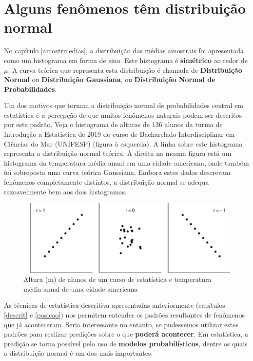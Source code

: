 \documentclass[
]{book}
\begin{document}
\hypertarget{normdist}{%
\chapter{Alguns fenômenos têm distribuição normal}\label{normdist}}

No capítulo \ref{amostrmedias}, a distribuição das médias amostrais foi apresentada como um histograma em forma de sino. Este histograma é \textbf{simétrico} ao redor de \(\mu\). A curva teórica que representa esta distribuição é chamada de \textbf{Distribuição Normal} ou \textbf{Distribuição Gaussiana}, ou \textbf{Distribuição Normal de Probabilidades}.

Um dos motivos que tornam a distribuição normal de probabilidades central em estatística é a percepção de que muitos fenômenos naturais podem ser descritos por este padrão. Veja o histograma de alturas de 136 alunos da turma de Introdução a Estatística de 2019 do curso de Bacharelado Interdisciplinar em Ciências do Mar (UNIFESP) (figura à esquerda). A linha sobre este histograma representa a distribuição normal teórica. À direita na mesma figura está um histograma da temperatura média anual em uma cidade americana, onde também foi sobreposta uma curva teórica Gaussiana. Embora estes dados descrevam fenômenos completamente distintos, a distribuição normal se adequa razoavelmente bem aos dois histogramas.

\begin{figure}

{\centering \includegraphics{probest-cambientais_files/figure-latex/unnamed-chunk-65-1} 

}

\caption{Altura (m) de alunos de um curso de estatística e temperatura média anual de uma cidade americana}\label{fig:unnamed-chunk-65}
\end{figure}

As técnicas de estatística descritiva apresentadas anteriormente (capítulos \ref{descrit} e \ref{posicao}) nos permitem entender os padrões resultantes de fenômenos que já aconteceram. Seria interessante no entanto, se pudessemos utilizar estes padrões para realizar predições sobre o que \textbf{poderá acontecer}. Em estatística, a predição se torna possível pelo uso de \textbf{modelos probabilísticos}, dentre os quais a distribuição normal é um dos mais importantes.
\end{document}
